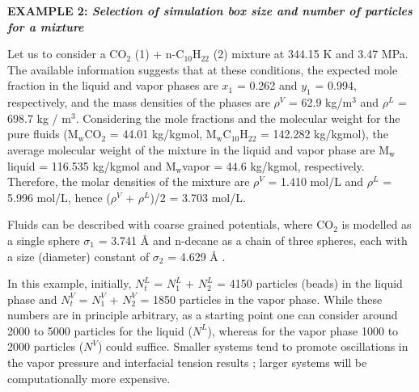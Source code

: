\documentclass[9pt,tutorial]{livecoms}
\begin{document}
\begin{mdframed}[linewidth=0pt,backgroundcolor=LiveCoMSLightBlue!8,fontcolor=LiveCoMSDarkBlue!80!black]
  \textbf{EXAMPLE 2: \textit{Selection of simulation box size and number of particles for a mixture}}

Let us to consider a CO$_{2}$ (1) + n-C$_{10}$H$_{22}$ (2) mixture at 344.15
K and 3.47 MPa. The available information \citep{shaver2001} suggests that at these
conditions, the expected mole fraction in the liquid and vapor phases are
$x_{1}$ = 0.262 and $y_{1}$ = 0.994, respectively, and the
mass densities of the phases are ${\rho}^{V}$ = 62.9 kg/m$^{3}$ and
${\rho}^{L}$ = 698.7 kg / m$^{3}$. Considering the mole fractions and the
molecular weight for the pure fluids (M$_{\mathrm{w}}$CO$_{2}$ = 44.01
kg/kgmol, M$_{\mathrm{w}}$C$_{10}$H$_{22}$ = 142.282 kg/kgmol), the average molecular
weight of the mixture in the liquid and vapor phase are M$_{\mathrm{w}}$liquid
= 116.535 kg/kgmol and M$_{\mathrm{w}}$vapor = 44.6 kg/kgmol, respectively.
Therefore, the molar densities of the mixture are  ${\rho}^{V}$ = 1.410 mol/L
and ${\rho}^{L}$ = 5.996 mol/L, hence (${\rho}^{V}$ + ${\rho}^{L}$)/2
= 3.703 mol/L.

Fluids can be described with coarse grained potentials, where CO$_{2}$ is
modelled as a single sphere ${\sigma}_{1}$ = 3.741 \AA{} \citep{avendano2011,mejia2014a}
 and n-decane as
a chain of three spheres, each with a size (diameter) constant of
${\sigma}_{2}$ = 4.629 \AA{} \citep{mejia2014a}.

In this example, initially, $N_{t}^{L}$ = $N_{1}^{L}$
+ $N_{2}^{L}$ = 4150 particles (beads) in the liquid phase and
$N_{t}^{V}$ = $N_{1}^{V}$ + $N_{2}^{V}$ = 1850
particles in the vapor phase. While these numbers are in principle arbitrary,
as a starting point one can consider around 2000 to 5000 particles for the
liquid ($N^{L}$), whereas for the vapor phase 1000 to 2000 particles
($N^{V}$) could suffice. Smaller systems tend to promote oscillations
in the vapor pressure and interfacial tension results \citep{gonzalez2005,orea2005,janecek2009};
larger systems will be computationally more expensive.


\end{mdframed}
\end{document}
